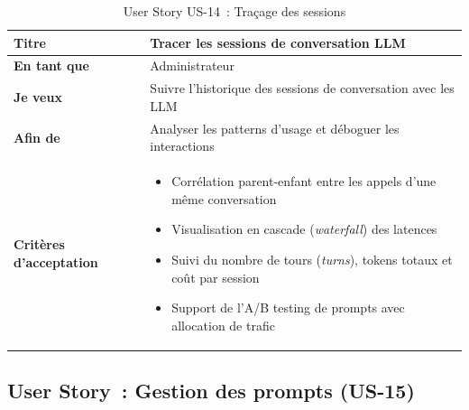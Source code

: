 \begin{table}[H]
\centering
\caption{User Story US-14~: Traçage des sessions}
\label{tab:us14}
\begin{tabularx}{\textwidth}{|l|X|}
\hline
\textbf{Titre} & Tracer les sessions de conversation LLM \\
\hline
\textbf{En tant que} & Administrateur \\
\hline
\textbf{Je veux} & Suivre l'historique des sessions de conversation avec les LLM \\
\hline
\textbf{Afin de} & Analyser les patterns d'usage et déboguer les interactions \\
\hline
\textbf{Critères d'acceptation} & \begin{minipage}[t]{\linewidth}\vspace{2pt}
\begin{itemize}[noitemsep,topsep=0pt]
\item Corrélation parent-enfant entre les appels d'une même conversation
\item Visualisation en cascade (\textit{waterfall}) des latences
\item Suivi du nombre de tours (\textit{turns}), tokens totaux et coût par session
\item Support de l'A/B testing de prompts avec allocation de trafic
\end{itemize}\vspace{2pt}
\end{minipage} \\
\hline
\end{tabularx}
\end{table}

\subsection{User Story~: Gestion des prompts (US-15)}

